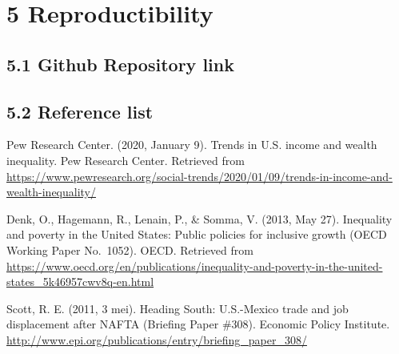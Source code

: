 \documentclass[
]{article}
\begin{document}
\section{5 Reproductibility}\label{reproductibility}

\subsection{5.1 Github Repository link}\label{github-repository-link}

\subsection{5.2 Reference list}\label{reference-list}

Pew Research Center. (2020, January 9). Trends in U.S. income and wealth
inequality. Pew Research Center. Retrieved from
\url{https://www.pewresearch.org/social-trends/2020/01/09/trends-in-income-and-wealth-inequality/}

Denk, O., Hagemann, R., Lenain, P., \& Somma, V. (2013, May 27).
Inequality and poverty in the United States: Public policies for
inclusive growth (OECD Working Paper No.~1052). OECD. Retrieved from
\url{https://www.oecd.org/en/publications/inequality-and-poverty-in-the-united-states_5k46957cwv8q-en.html}

Scott, R. E. (2011, 3 mei). Heading South: U.S.-Mexico trade and job
displacement after NAFTA (Briefing Paper \#308). Economic Policy
Institute.
\url{http://www.epi.org/publications/entry/briefing_paper_308/}
\end{document}
